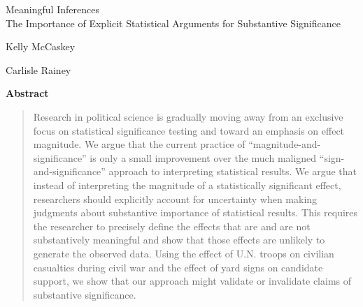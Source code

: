 \documentclass[12pt]{article}
\begin{document}
\begin{center}
{\LARGE Meaningful Inferences}\\\vspace{2mm}
{\large The Importance of Explicit Statistical Arguments for Substantive Significance}\\\vspace{2mm}


\vspace{10mm}

Kelly McCaskey

\vspace{3mm}

Carlisle Rainey
\end{center}

\vspace{10mm}

{\centerline{\textbf{Abstract}}}
\begin{quote}\noindent
Research in political science is gradually moving away from an exclusive focus on statistical significance testing and toward an emphasis on effect magnitude. We argue that the current practice of ``magnitude-and-significance'' is only a small improvement over the much maligned ``sign-and-significance'' approach to interpreting statistical results. We argue that instead of interpreting the magnitude of a statistically significant effect, researchers should explicitly account for uncertainty when making judgments about substantive importance of statistical results. This requires the researcher to precisely define the effects that are and are not substantively meaningful and show that those effects are unlikely to generate the observed data. Using the effect of U.N. troops on civilian casualties during civil war and the effect of yard signs on candidate support, we show that our approach might validate or invalidate claims of substantive significance. 
 \end{quote}
\end{document}
